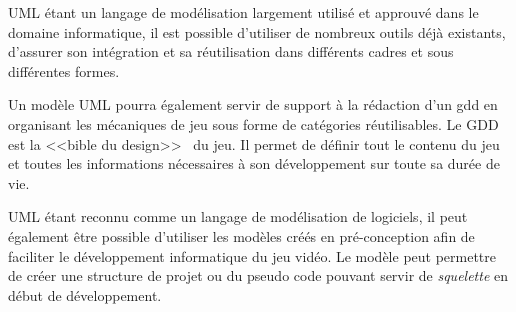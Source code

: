 UML étant un langage de modélisation largement utilisé et approuvé dans le domaine informatique, il est possible d'utiliser de nombreux outils d\'ej\`a existants, d'assurer son intégration et sa réutilisation dans différents cadres et sous différentes formes.





Un modèle UML pourra également servir de support à la rédaction d'un \gls{gdd} en organisant les mécaniques de jeu sous forme de catégories réutilisables. Le GDD est la <<bible du design>>~\cite{GD_foundations_pedersen} du jeu. Il permet de définir tout le contenu du jeu et toutes les informations nécessaires à son développement sur toute sa durée de vie. 

UML étant reconnu comme un langage de modélisation de logiciels, il peut également être possible d'utiliser les modèles créés en pré-conception afin de faciliter le développement informatique du jeu vidéo. Le modèle peut permettre de créer une structure de projet ou du pseudo code pouvant servir de \emph{squelette} en début de développement.


